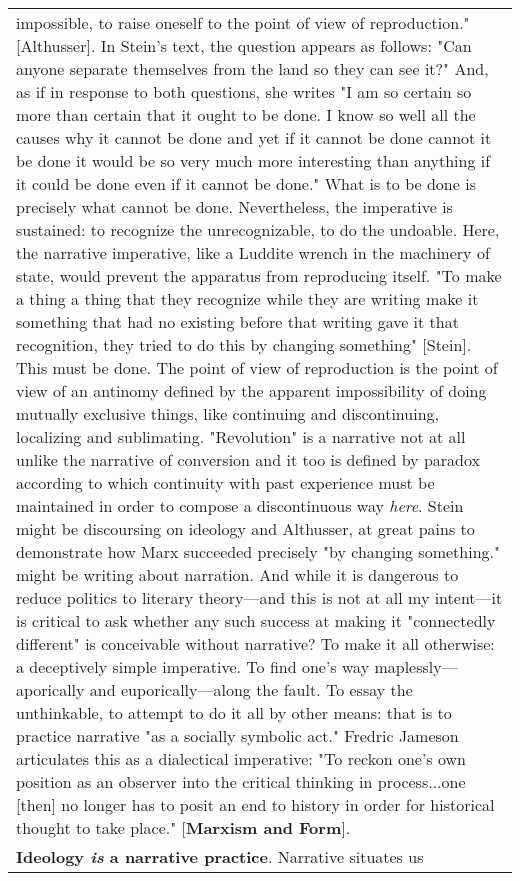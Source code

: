 \begin{longtable}[]{@{}l@{}}
\begin{minipage}[t]{0.97\columnwidth}
impossible, to raise oneself to the point of view of reproduction."
{[}Althusser{]}. In Stein's text, the question appears as follows: "Can
anyone separate themselves from the land so they can see it?" And, as if
in response to both questions, she writes "I am so certain so more than
certain that it ought to be done. I know so well all the causes why it
cannot be done and yet if it cannot be done cannot it be done it would
be so very much more interesting than anything if it could be done even
if it cannot be done." What is to be done is precisely what cannot be
done. Nevertheless, the imperative is sustained: to recognize the
unrecognizable, to do the undoable. Here, the narrative imperative, like
a Luddite wrench in the machinery of state, would prevent the apparatus
from reproducing itself. "To make a thing a thing that they recognize
while they are writing make it something that had no existing before
that writing gave it that recognition, they tried to do this by changing
something" {[}Stein{]}. This must be done. The point of view of
reproduction is the point of view of an antinomy defined by the apparent
impossibility of doing mutually exclusive things, like continuing and
discontinuing, localizing and sublimating. "Revolution" is a narrative
not at all unlike the narrative of conversion and it too is defined by
paradox according to which continuity with past experience must be
maintained in order to compose a discontinuous way \emph{here}. Stein
might be discoursing on ideology and Althusser, at great pains to
demonstrate how Marx succeeded precisely "by changing something." might
be writing about narration. And while it is dangerous to reduce politics
to literary theory---and this is not at all my intent---it is critical
to ask whether any such success at making it "connectedly different" is
conceivable without narrative? To make it all otherwise: a deceptively
simple imperative. To find one's way maplessly---aporically and
euporically---along the fault. To essay the unthinkable, to attempt to
do it all by other means: that is to practice narrative "as a socially
symbolic act." Fredric Jameson articulates this as a dialectical
imperative: "To reckon one's own position as an observer into the
critical thinking in process...one {[}then{]} no longer has to posit an
end to history in order for historical thought to take place."
{[}\textbf{Marxism and Form}{]}.\strut
\end{minipage}\tabularnewline
\begin{minipage}[t]{0.97\columnwidth}\raggedright
\textbf{Ideology \emph{is} a narrative practice}. Narrative situates us

\end{minipage}
\end{longtable}
